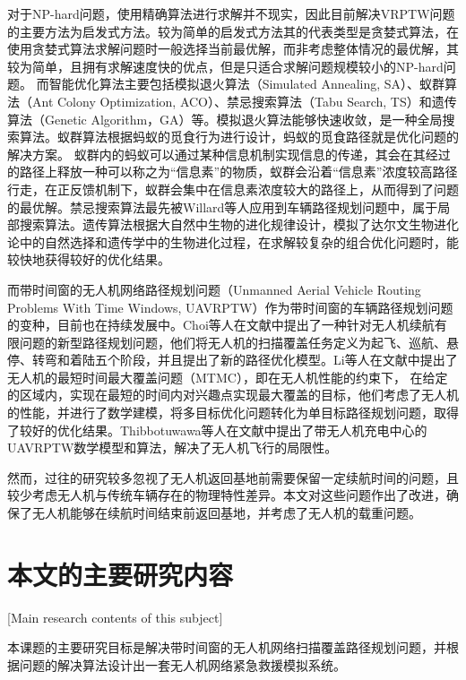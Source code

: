 对于NP-hard问题，使用精确算法进行求解并不现实，因此目前解决VRPTW问题的主要方法为启发式方法。较为简单的启发式方法其的代表类型是贪婪式算法，在使用贪婪式算法求解问题时一般选择当前最优解，而非考虑整体情况的最优解，其较为简单，且拥有求解速度快的优点，但是只适合求解问题规模较小的NP-hard问题。
而智能优化算法主要包括模拟退火算法（Simulated Annealing, SA）、蚁群算法（Ant Colony Optimization, ACO）、禁忌搜索算法（Tabu Search, TS）和遗传算法（Genetic Algorithm，GA）等。模拟退火算法能够快速收敛，是一种全局搜索算法\cite{lee2021simulated}。蚁群算法根据蚂蚁的觅食行为进行设计，蚂蚁的觅食路径就是优化问题的解决方案。
蚁群内的蚂蚁可以通过某种信息机制实现信息的传递，其会在其经过的路径上释放一种可以称之为“信息素”的物质，蚁群会沿着“信息素”浓度较高路径行走，在正反馈机制下，蚁群会集中在信息素浓度较大的路径上，从而得到了问题的最优解\cite{wu2021hybrid}。禁忌搜索算法最先被Willard等人应用到车辆路径规划问题中\cite{ilhan2021improved}，属于局部搜索算法。遗传算法根据大自然中生物的进化规律设计，模拟了达尔文生物进化论中的自然选择和遗传学中的生物进化过程，在求解较复杂的组合优化问题时，能较快地获得较好的优化结果。


而带时间窗的无人机网络路径规划问题（Unmanned Aerial Vehicle Routing Problems With Time Windows, UAVRPTW）作为带时间窗的车辆路径规划问题的变种，目前也在持续发展中。Choi等人在文献中提出了一种针对无人机续航有限问题的新型路径规划问题，他们将无人机的扫描覆盖任务定义为起飞、巡航、悬停、转弯和着陆五个阶段，并且提出了新的路径优化模型\cite{2019Energy}。Li等人在文献中提出了无人机的最短时间最大覆盖问题（MTMC），即在无人机性能的约束下，
在给定的区域内，实现在最短的时间内对兴趣点实现最大覆盖的目标，他们考虑了无人机的性能，并进行了数学建模，将多目标优化问题转化为单目标路径规划问题，取得了较好的优化结果\cite{2020A}。Thibbotuwawa等人在文献中提出了带无人机充电中心的UAVRPTW数学模型和算法，解决了无人机飞行的局限性\cite{thibbotuwawa2020unmanned}。


然而，过往的研究较多忽视了无人机返回基地前需要保留一定续航时间的问题，且较少考虑无人机与传统车辆存在的物理特性差异。本文对这些问题作出了改进，确保了无人机能够在续航时间结束前返回基地，并考虑了无人机的载重问题。
\section{本文的主要研究内容}[Main research contents of this subject]

本课题的主要研究目标是解决带时间窗的无人机网络扫描覆盖路径规划问题，并根据问题的解决算法设计出一套无人机网络紧急救援模拟系统。

